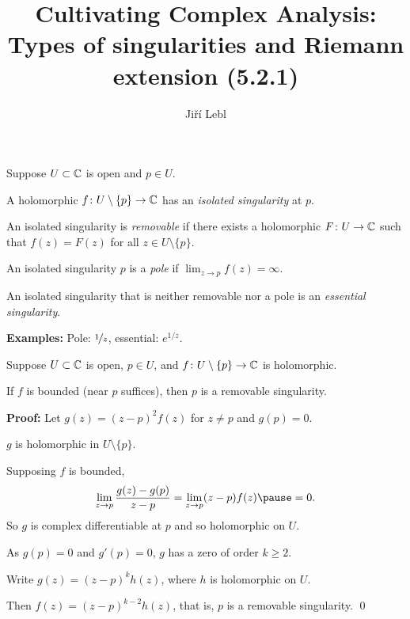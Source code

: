 \documentclass[10pt,aspectratio=169]{beamer}
\author{Ji\v{r}\'i Lebl}
\institute[OSU]{%
Departemento pri Matematiko de Oklahoma {\^S}tata Universitato}
\title{Cultivating Complex Analysis:\\%
Types of singularities and Riemann extension (5.2.1)}
\date{}
\begin{document}
\begin{frame}
\titlepage
\end{frame}

\begin{frame}
\begin{definition}
Suppose $U \subset {\mathbb{C}}$ is open and $p \in U$.

\medskip
\pause
A holomorphic $f \colon U \setminus \{ p \} \to {\mathbb{C}}$ has
an \emph{isolated singularity} at $p$.

\medskip
\pause
An isolated singularity is \emph{removable}
if there exists a holomorphic $F \colon U \to {\mathbb{C}}$
such that $f(z) = F(z)$ for all $z \in U \setminus \{ p \}$.

\medskip
\pause
An isolated singularity $p$ is a \emph{pole} if 
$\displaystyle
\lim_{z \to p} f(z) = \infty$.

\medskip
\pause
An isolated singularity that is neither removable nor a pole is 
an \emph{essential singularity}.
\end{definition}

\pause

\textbf{Examples:} Pole: $\nicefrac{1}{z}$, essential: $e^{1/z}$.

%

\end{frame}

\begin{frame}

\begin{theorem}
Suppose $U \subset {\mathbb{C}}$ is open, $p \in U$,
and $f \colon U \setminus \{p\} \to {\mathbb{C}}$ is holomorphic.

\pause
If $f$ is bounded (near $p$ suffices), then $p$ is a removable singularity.
\end{theorem}

\pause

\textbf{Proof:}
Let $g(z) = {(z-p)}^2 f(z)$ for $z \not= p$ and $g(p) = 0$.

\medskip
\pause

$g$ is holomorphic in $U \setminus \{ p \}$.

\medskip
\pause

Supposing $f$ is bounded,
\[
\lim_{z\to p} \frac{g(z)-g(p)}{z-p} = \lim_{z\to p} (z-p) f(z) \pause = 0 .
\]
\pause
So $g$ is complex differentiable at $p$ and so holomorphic on $U$.

\medskip
\pause

As $g(p)=0$ and $g'(p)=0$, $g$ has a zero of order $k \geq 2$.

\medskip
\pause

Write $g(z) = {(z-p)}^k h(z)$, where $h$ is holomorphic on $U$.

\medskip
\pause

Then $f(z) = {(z-p)}^{k-2}h(z)$, that is, $p$ is a removable singularity.
\qed

\end{frame}
\end{document}
